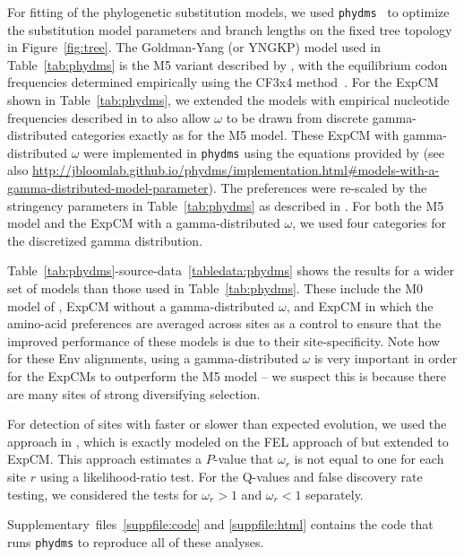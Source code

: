 \documentclass[9pt]{elife}
\begin{document}
For fitting of the phylogenetic substitution models, we used \texttt{phydms}~\citep[][\url{http://jbloomlab.github.io/phydms/}]{hilton2017phydms} to optimize the substitution model parameters and branch lengths on the fixed tree topology in Figure~\ref{fig:tree}.
The Goldman-Yang (or YNGKP) model used in Table~\ref{tab:phydms} is the M5 variant described by \citet{yang2000codon}, with the equilibrium codon frequencies determined empirically using the CF3x4 method~\citep{pond2010correcting}.
For the ExpCM shown in Table~\ref{tab:phydms}, we extended the models with empirical nucleotide frequencies described in \citet{hilton2017phydms} to also allow $\omega$ to be drawn from discrete gamma-distributed categories exactly as for the M5 model.
These ExpCM with gamma-distributed $\omega$ were implemented in \texttt{phydms} using the equations provided by \citet{yang1994maximum} (see also \url{http://jbloomlab.github.io/phydms/implementation.html#models-with-a-gamma-distributed-model-parameter}).
The preferences were re-scaled by the stringency parameters in Table~\ref{tab:phydms} as described in \citet{hilton2017phydms}.
For both the M5 model and the ExpCM with a gamma-distributed $\omega$, we used four categories for the discretized gamma distribution.

Table~\ref{tab:phydms}-source-data~\ref{tabledata:phydms} shows the results for a wider set of models than those used in Table~\ref{tab:phydms}. 
These include the M0 model of \citet{yang2000codon}, ExpCM without a gamma-distributed $\omega$, and ExpCM in which the amino-acid preferences are averaged across sites as a control to ensure that the improved performance of these models is due to their site-specificity.
Note how for these Env alignments, using a gamma-distributed $\omega$ is very important in order for the ExpCMs to outperform the M5 model -- we suspect this is because there are many sites of strong diversifying selection.

For detection of sites with faster or slower than expected evolution, we used the approach in \citet{bloom2017identification}, which is exactly modeled on the FEL approach of \citet{kosakovsky2005not} but extended to ExpCM.
This approach estimates a $P$-value that $\omega_r$ is not equal to one for each site $r$ using a likelihood-ratio test.
For the Q-values and false discovery rate testing, we considered the tests for $\omega_r > 1$ and $\omega_r < 1$ separately.

Supplementary~files~\ref{suppfile:code} and \ref{suppfile:html} contains the code that runs \texttt{phydms} to reproduce all of these analyses.
\end{document}
